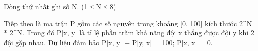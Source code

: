 Dòng thứ nhất ghi số N. (1 ≤ N ≤ 8)  

   Tiếp theo là ma trận P gồm các số nguyên trong khoảng [0, 100] kích thước 2^N * 2^N. Trong đó P[x, y] là tỉ lệ phần trăm khả năng đội x thắng được đội y khi 2 đội gặp nhau. Dữ liệu đảm bảo P[x, y] + P[y, x] = 100; P[x, x] = 0.